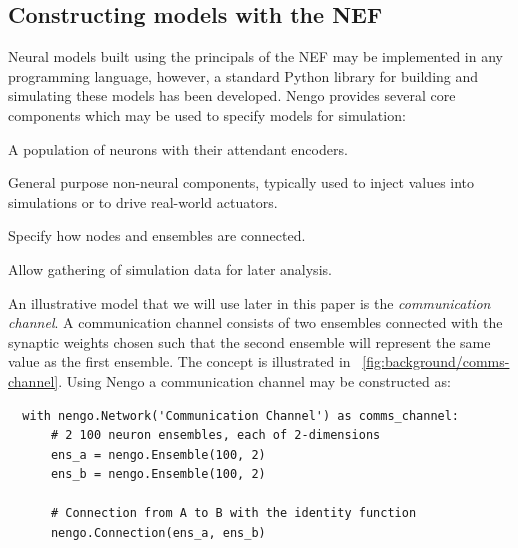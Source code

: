\documentclass[conference]{IEEEtran}
\begin{document}
%
%

  \subsection{Constructing models with the NEF}

Neural models built using the principals of the NEF may be implemented in any programming language, however, a standard Python library for building and simulating these models has been developed. Nengo \parencite{Bekolay2014} provides several core components which may be used to specify models for simulation:

  \begin{description}
    \item[Ensembles] A population of neurons with their attendant encoders.
    \item[Nodes] General purpose non-neural components, typically used to inject values into simulations or to drive real-world actuators.
    \item[Connections] Specify how nodes and ensembles are connected.
    \item[Probes] Allow gathering of simulation data for later analysis.
  \end{description}

  An illustrative model that we will use later in this paper is the \textit{communication channel}. A communication channel consists of two ensembles connected with the synaptic weights chosen such that the second ensemble will represent the same value as the first ensemble. The concept is illustrated in \figurename~\ref{fig:background/comms-channel}. Using Nengo a communication channel may be constructed as:

  \begin{lstlisting}
  with nengo.Network('Communication Channel') as comms_channel:
      # 2 100 neuron ensembles, each of 2-dimensions
      ens_a = nengo.Ensemble(100, 2)
      ens_b = nengo.Ensemble(100, 2)

      # Connection from A to B with the identity function
      nengo.Connection(ens_a, ens_b)
  \end{lstlisting}
\end{document}
